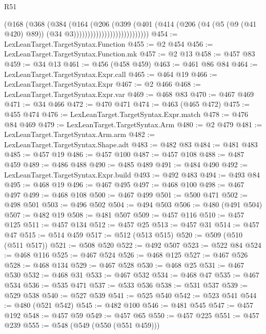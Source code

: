 \begin{lexlean}{R51}
\begin{coremodule}
                                    (@168
                                      (@368
                                        (@384
                                          (@164
                                            (@206
                                              (@399
                                                (@401
                                                  (@414
                                                    (@206
                                                      (@4
                                                        (@5 (@9 (@41 @420) @89))
                                                        (@34 @3)))))))))))))))))))))))))))
@454 := LexLeanTarget.TargetSyntax.Function
@455 := @2 @454
@456 := LexLeanTarget.TargetSyntax.Function.mk
@457 := @2 @13
@458 := @457 @83
@459 := @34 @13
@461 := @456 (@458 @459)
@463 := @461 @86 @84
@464 := LexLeanTarget.TargetSyntax.Expr.call
@465 := @464 @19
@466 := LexLeanTarget.TargetSyntax.Expr
@467 := @2 @466
@468 := LexLeanTarget.TargetSyntax.Expr.var
@469 := @468 @83
@470 := @467 @469
@471 := @34 @466
@472 := @470 @471
@474 := @463 (@465 @472)
@475 := @455 @474
@476 := LexLeanTarget.TargetSyntax.Expr.match
@478 := @476 @84 @469
@479 := LexLeanTarget.TargetSyntax.Arm
@480 := @2 @479
@481 := LexLeanTarget.TargetSyntax.Arm.arm
@482 := LexLeanTarget.TargetSyntax.Shape.adt
@483 := @482 @83
@484 := @481 @483
@485 := @457 @19
@486 := @457 @100
@487 := @457 @108
@488 := @487 @459
@489 := @486 @488
@490 := @485 @489
@491 := @484 @490
@492 := LexLeanTarget.TargetSyntax.Expr.build
@493 := @492 @483
@494 := @493 @84
@495 := @468 @19
@496 := @467 @495
@497 := @468 @100
@498 := @467 @497
@499 := @468 @108
@500 := @467 @499
@501 := @500 @471
@502 := @498 @501
@503 := @496 @502
@504 := @494 @503
@506 := @480 (@491 @504)
@507 := @482 @19
@508 := @481 @507
@509 := @457 @116
@510 := @457 @125
@511 := @457 @134
@512 := @457 @25
@513 := @457 @31
@514 := @457 @47
@515 := @514 @459
@517 := @512 (@513 @515)
@520 := @509 (@510 (@511 @517))
@521 := @508 @520
@522 := @492 @507
@523 := @522 @84
@524 := @468 @116
@525 := @467 @524
@526 := @468 @125
@527 := @467 @526
@528 := @468 @134
@529 := @467 @528
@530 := @468 @25
@531 := @467 @530
@532 := @468 @31
@533 := @467 @532
@534 := @468 @47
@535 := @467 @534
@536 := @535 @471
@537 := @533 @536
@538 := @531 @537
@539 := @529 @538
@540 := @527 @539
@541 := @525 @540
@542 := @523 @541
@544 := @480 (@521 @542)
@545 := @482 @100
@546 := @481 @545
@547 := @457 @192
@548 := @457 @59
@549 := @457 @65
@550 := @457 @225
@551 := @457 @239
@555 := @548 (@549 (@550 (@551 @459)))

\end{coremodule}
\end{lexlean}
